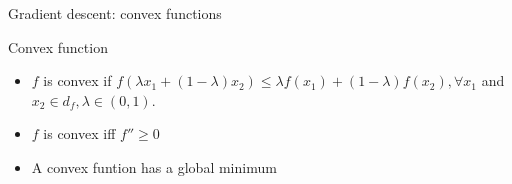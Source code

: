 \documentclass[
  9pt,
  ignorenonframetext,
  aspectratio=169,
  t, dvipsnames]{beamer}
\providecommand{\tightlist}{%
  \setlength{\itemsep}{0pt}\setlength{\parskip}{0pt}}\usepackage{longtable,booktabs,array}
\theoremstyle{definition}
\begin{document}
\begin{frame}{Gradient descent: convex functions}
\protect\hypertarget{gradient-descent-convex-functions}{}
\begin{exampleblock}{Convex function}

\begin{itemize}
\tightlist
\item
  \(f\) is convex if
  \(f\left(\lambda x_{1}+(1-\lambda) x_{2}\right) \leq \lambda f\left(x_{1}\right)+(1-\lambda) f\left(x_{2}\right), \forall x_{1}\)
  and \(x_{2} \in d_f, \lambda \in(0,1)\).
\item
  \(f\) is convex iff \(f'' \geq 0\)
\item
  A convex funtion has a global minimum
\end{itemize}

\end{exampleblock}

\begin{figure}

\begin{minipage}[t]{0.50\linewidth}

{\centering 


}

\end{minipage}%
%
\begin{minipage}[t]{0.50\linewidth}

{\centering 


}

\end{minipage}%

\end{figure}
\end{frame}
\end{document}
